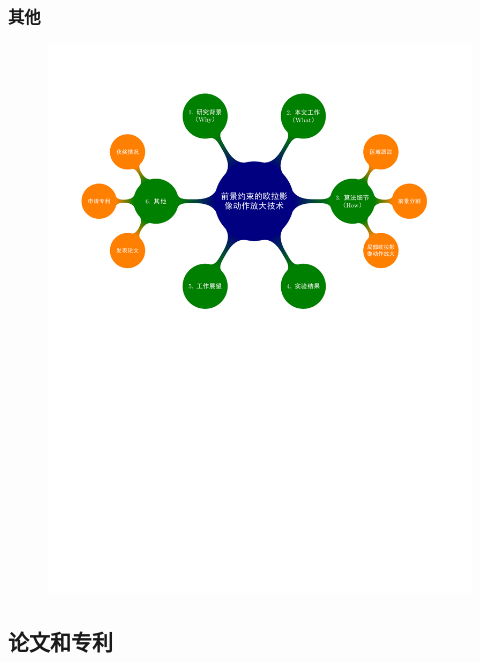 \documentclass[xcolor=svgnames,serif,table,10pt]{beamer}
\begin{document}
\begin{frame}
  \frametitle{其他}
  \vspace{-2.5em}
  \begin{figure}
    \centering
    \includegraphics[width=\textwidth, page=10]{mindmap.pdf}
  \end{figure}
\end{frame}

\subsection{论文和专利}
\end{document}
